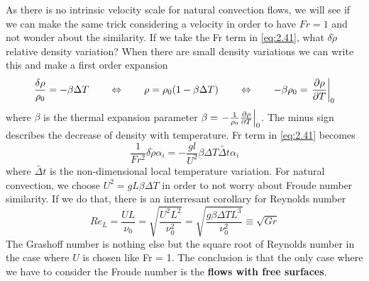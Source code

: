 			As there is no intrinsic velocity scale for natural convection flows, we will see if we can make the same trick considering a velocity in order to have $Fr = 1$ and not wonder about the similarity. If we take the Fr term in \eqref{eq:2.41}, what $\delta \tilde{\rho}$ relative density variation? When there are small density variations we can write this and make a first order expansion
			\begin{equation}
				\frac{\delta \rho}{\rho_0} = -\beta \Delta T \qquad \Leftrightarrow \qquad \rho = \rho _0 (1-\beta \Delta T) \qquad \Leftrightarrow \qquad - \beta \rho _0 = \left.\frac{\partial \rho}{\partial T}\right|_0
			\end{equation}
			where $\beta$ is the thermal expansion parameter $\beta = \left.- \frac{1}{\rho_0} \frac{\partial \rho}{\partial T}\right|_0$. The minus sign describes the decrease of density with temperature. Fr term in \eqref{eq:2.41} becomes
			\begin{equation}
				\frac{1}{Fr ^2} \delta \tilde{\rho} \alpha _i = -\frac{gl}{U^2}\beta \Delta T \tilde{\Delta t} \alpha _i
			\end{equation}
			where $\tilde{\Delta t}$ is the non-dimensional local temperature variation. For natural convection, we choose $U^2 = gL\beta \Delta T$ in order to not worry about Froude number similarity. If we do that, there is an interresant corollary for Reynolds number
			\begin{equation}
				Re_L = \frac{UL}{\nu _0} = \sqrt{\frac{U^2L^2}{\nu _0^2}} = \sqrt{\frac{g\beta \Delta T L^3}{\nu _0^2}} \equiv \sqrt{Gr}				
			\end{equation}
			The Grashoff number is nothing else but the square root of Reynolds number in the case where $U$ is chosen like Fr = 1. The conclusion is that the only case where we have to consider the Froude number is the \textbf{flows with free surfaces}.  
			
